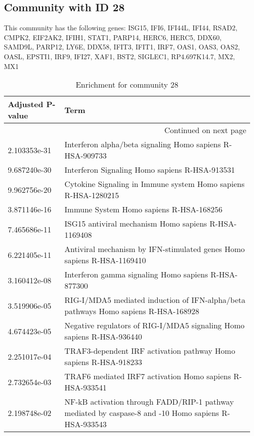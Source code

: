 \subsection*{Community with ID 28}
This community has the following genes: ISG15, IFI6, IFI44L, IFI44, RSAD2, CMPK2, EIF2AK2, IFIH1, STAT1, PARP14, HERC6, HERC5, DDX60, SAMD9L, PARP12, LY6E, DDX58, IFIT3, IFIT1, IRF7, OAS1, OAS3, OAS2, OASL, EPSTI1, IRF9, IFI27, XAF1, BST2, SIGLEC1, RP4.697K14.7, MX2, MX1
\\
\begin{longtable}{p{2.4cm}p{14.5cm}}
\caption{Enrichment for community 28}\\
\toprule
Adjusted \newline P-value &                                                                                                 Term \\
\midrule
\endhead
\midrule
\multicolumn{2}{r}{{Continued on next page}} \\
\midrule
\endfoot

\bottomrule
\endlastfoot
             2.103353e-31 &                                            Interferon alpha/beta signaling Homo sapiens R-HSA-909733 \\
             9.687240e-30 &                                                       Interferon Signaling Homo sapiens R-HSA-913531 \\
             9.962756e-20 &                                       Cytokine Signaling in Immune system Homo sapiens R-HSA-1280215 \\
             3.871146e-16 &                                                              Immune System Homo sapiens R-HSA-168256 \\
             7.465686e-11 &                                                 ISG15 antiviral mechanism Homo sapiens R-HSA-1169408 \\
             6.221405e-11 &                               Antiviral mechanism by IFN-stimulated genes Homo sapiens R-HSA-1169410 \\
             3.160412e-08 &                                                 Interferon gamma signaling Homo sapiens R-HSA-877300 \\
             3.519906e-05 &                   RIG-I/MDA5 mediated induction of IFN-alpha/beta pathways Homo sapiens R-HSA-168928 \\
             4.674423e-05 &                                Negative regulators of RIG-I/MDA5 signaling Homo sapiens R-HSA-936440 \\
             2.251017e-04 &                                     TRAF3-dependent IRF activation pathway Homo sapiens R-HSA-918233 \\
             2.732654e-03 &                                             TRAF6 mediated IRF7 activation Homo sapiens R-HSA-933541 \\
             2.198748e-02 &  NF-kB activation through FADD/RIP-1 pathway mediated by caspase-8 and -10 Homo sapiens R-HSA-933543 \\
\end{longtable}


